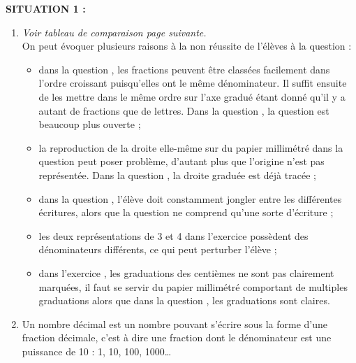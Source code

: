 \begin{corrige}
{\bf SITUATION 1 :} \\
\begin{enumerate}
   \item {\it Voir tableau de comparaison page suivante.} \\
   On peut évoquer plusieurs raisons à la non réussite de l'élèves à la question  :
   \begin{itemize}
      \item dans la question , les fractions peuvent être classées facilement dans l'ordre croissant puisqu'elles ont le même dénominateur. Il suffit ensuite de les mettre dans le même ordre sur l'axe gradué étant donné qu'il y a autant de fractions que de lettres. Dans la question , la question est beaucoup plus ouverte ;
      \item la reproduction de la droite elle-même sur du papier millimétré dans la question  peut poser problème, d'autant plus que l'origine n'est pas représentée. Dans la question , la droite graduée est déjà tracée ;
      \item dans la question , l'élève doit constamment \og jongler \fg{} entre les différentes écritures, alors que la question  ne comprend qu'une sorte d'écriture ;
      \item les deux représentations de 3 et 4 dans l'exercice  possèdent des dénominateurs différents, ce qui peut perturber l'élève ;
      \item dans l'exercice , les graduations des centièmes ne sont pas clairement marquées, il faut se servir du papier millimétré comportant de multiples graduations alors que dans la question , les graduations sont claires.
   \end{itemize}
   \item Un nombre décimal est un nombre pouvant s'écrire sous la forme d'une fraction décimale, c'est à dire une fraction dont le dénominateur est une puissance de 10 : 1, 10, 100, 1000\dots \\
\end{enumerate} 


\end{corrige}
